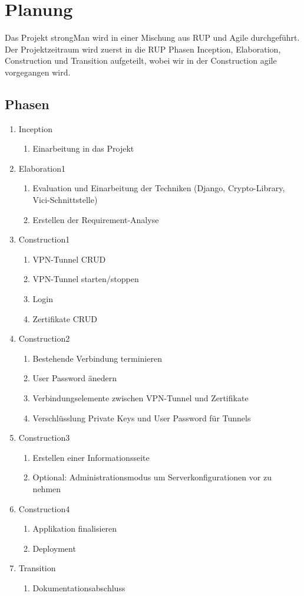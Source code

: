 \section{Planung}
Das Projekt strongMan wird in einer Mischung aus RUP und Agile durchgeführt. Der Projektzeitraum wird zuerst in die RUP Phasen Inception, Elaboration, Construction und Transition aufgeteilt, wobei wir in der Construction agile vorgegangen wird.

\subsection{Phasen}
\begin{enumerate}
  \item Inception
  \begin{enumerate}
    \item Einarbeitung in das Projekt
  \end{enumerate}
  \item Elaboration1
  \begin{enumerate}
    \item Evaluation und Einarbeitung der Techniken (Django, Crypto-Library, Vici-Schnittstelle)
    \item Erstellen der Requirement-Analyse
  \end{enumerate}
  \item Construction1
  \begin{enumerate}
    \item VPN-Tunnel CRUD
    \item VPN-Tunnel starten/stoppen
    \item Login 
    \item Zertifikate CRUD
  \end{enumerate}
  \item Construction2
  \begin{enumerate}
    \item Bestehende Verbindung terminieren
    \item User Password änedern 
    \item Verbindungselemente zwischen VPN-Tunnel und Zertifikate
    \item Verschlüsslung Private Keys und User Password für Tunnels
  \end{enumerate}
    \item Construction3
  \begin{enumerate}
  	\item Erstellen einer Informationsseite
    \item Optional: Administrationsmodus um Serverkonfigurationen vor zu nehmen
  \end{enumerate}
      \item Construction4
  \begin{enumerate}
    \item Applikation finalisieren
    \item Deployment
  \end{enumerate}
  \item Transition
  \begin{enumerate}
    \item Dokumentationsabschluss
  \end{enumerate}
\end{enumerate}
